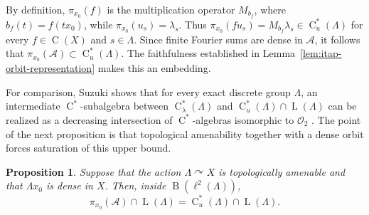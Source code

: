 \documentclass[11pt]{amsart}
\numberwithin{equation}{section}
\newcommand{\rL}{\operatorname{L}}
\newcommand{\rB}{\operatorname{B}}
\newcommand{\rC}{\operatorname{C}}
\newtheorem{proposition}[theorem]{Proposition}
\theoremstyle{definition}
\begin{document}
	By definition, \(\pi_{x_0}(f)\) is the multiplication operator \(M_{b_f}\), where \(b_f(t)=f(tx_0)\), while \(\pi_{x_0}(u_s)=\lambda_s\). Thus \(\pi_{x_0}(fu_s)=M_{b_f}\lambda_s\in\rC_u^*(\Lambda)\) for every \(f\in\rC(X)\) and \(s\in\Lambda\). Since finite Fourier sums are dense in \(\mathcal A\), it follows that \(\pi_{x_0}(\mathcal A)\subset\rC_u^*(\Lambda)\). The faithfulness established in Lemma~\ref{lem:itap-orbit-representation} makes this an embedding.

	For comparison, Suzuki shows that for every exact discrete group \(\Lambda\), an
	intermediate \(\rC^*\)-subalgebra between \(\rC^*_{\lambda}(\Lambda)\) and
	\(\rC_u^*(\Lambda)\cap\rL(\Lambda)\) can be realized as a decreasing intersection
	of \(\rC^*\)-algebras isomorphic to \(\mathcal O_2\)
	\cite[Theorem~A]{Su17}. The point of the next proposition is that topological
	amenability together with a dense orbit forces saturation of this upper bound.
	
	\begin{proposition}\label{prop:amenable-orbit-saturation}
		Suppose that the action \(\Lambda\curvearrowright X\) is topologically amenable and that \(\Lambda x_0\) is dense in \(X\). Then, inside \(\rB(\ell^2(\Lambda))\),
		\begin{equation}
			\pi_{x_0}(\mathcal A)\cap\rL(\Lambda)
			=
			\rC_u^*(\Lambda)\cap\rL(\Lambda).
		\end{equation}
	\end{proposition}
	
\end{document}
